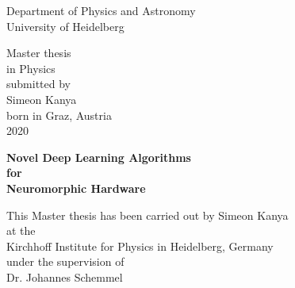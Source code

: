 \begin{titlepage}
	
	
	\thispagestyle{empty}
	\begin{center}
		\renewcommand{\baselinestretch}{2.00}
		\Large\sffamily
		Department of Physics and Astronomy\\
		\large University of Heidelberg
		\par\vfill\normalfont
		Master thesis\\
		in Physics\\
		submitted by\\
		Simeon Kanya\\
		born in Graz, Austria\\
		2020
	\end{center}
	\newpage
	
	\thispagestyle{empty}
	\begin{center}
		\renewcommand{\baselinestretch}{2.00}
		\Large\bfseries\sffamily
		Novel Deep Learning Algorithms  \\
		for\\
		Neuromorphic Hardware
		\par
		\vfill
		\large\normalfont
		This Master thesis has been carried out by Simeon Kanya\\
		at the\\
		Kirchhoff Institute for Physics in Heidelberg, Germany\\
		under the supervision of\\
		Dr. Johannes Schemmel
	\end{center}\par
	\vspace{5\baselineskip}
	
	\renewcommand{\baselinestretch}{1.00}\normalsize
\end{titlepage}


